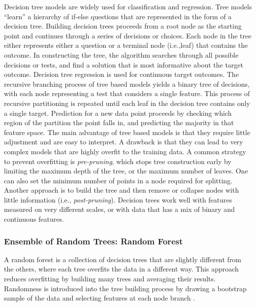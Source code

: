 \documentclass[sigconf]{acmart}
\begin{document}
Decision tree models are widely used for classification and regression. Tree 
models ``learn'' a hierarchy of if-else questions that are represented in the
form of a decision tree. Building decision trees proceeds from a root node as 
the starting point and continues through a series of decisions or choices.
Each node in the tree either represents either a question or a terminal node 
(i.e.,leaf) that contains the outcome. In constructing the tree, the algorithm 
searches through all possible decisions or tests, and find a solution that is 
most informative about the target outcome. Decision tree regression is used 
for continuous target outcomes. The recursive branching process of tree based 
models yields a binary tree of decisions, with each node representing a test 
that considers a single feature. This process of recursive partitioning is 
repeated until each leaf in the decision tree contains only a single target. 
Prediction for a new data point proceeds by checking which region of the 
partition the point falls in, and predicting the majority in that feature space. 
The main advantage of tree based models is that they require little adjustment 
and are easy to interpret. A drawback is that they can lead to very complex
models that are highly overfit to the training data. A common strategy to 
prevent overfitting is \emph{pre-pruning}, which stops tree construction early 
by limiting the maximum depth of the tree, or the maximum number of leaves. 
One can also set the minimum number of points in a node required for splitting.
Another approach is to build the tree and then remove or collapse nodes with 
little information (i.e., \emph{post-pruning}). Decision trees work well with 
features measured on very different scales, or with data that has a mix of 
binary and continuous features. 

\subsubsection{Ensemble of Random Trees: Random Forest}

A random forest is a collection of decision trees that are slightly different 
from the others, where each tree overfits the data in a different way. This 
approach reduces overfitting by building many trees and averaging 
their results. Randomness is introduced into the tree building process by
drawing a bootstrap sample of the data and selecting features at each node 
branch \cite{muller17,raschka17}. 
\end{document}
